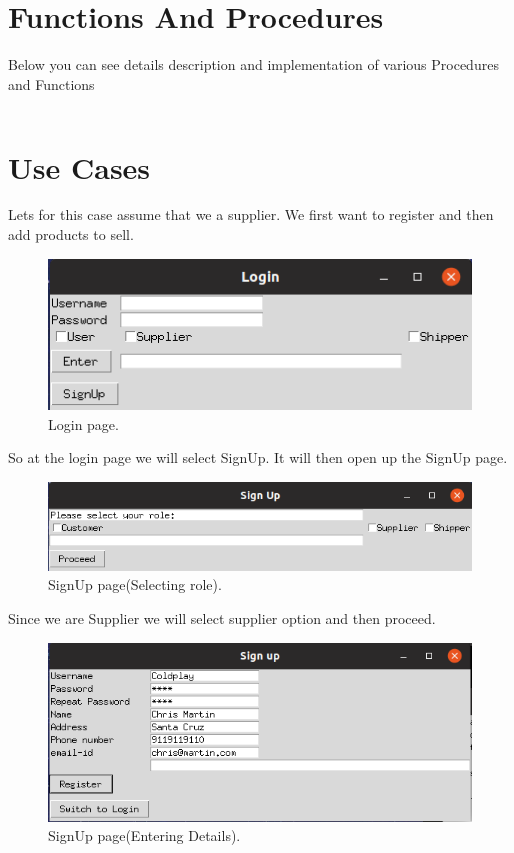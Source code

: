 \documentclass[a4paper,12pt]{article}
\begin{document}
\newpage
\section{Functions And Procedures}
Below you can see details description and implementation of various Procedures and Functions
\begin{verbatim}

\end{verbatim}
\section{Use Cases}
Lets for this case assume that we a supplier. We first want to register and then add products to sell.
\begin{figure}[H]
    \centering
    \includegraphics[scale=0.5]{login1.png} 
    \caption{Login page.}
\end{figure}
So at the login page we will select SignUp. It will then open up the SignUp page.
\begin{figure}[H]
    \centering
    \includegraphics[scale=0.5]{signup1.png}
    \caption{SignUp page(Selecting role).}
\end{figure}
Since we are Supplier we will select supplier option and then proceed.
\begin{figure}[H]
    \centering
    \includegraphics[scale=0.5]{signup2.png}
    \caption{SignUp page(Entering Details).}
\end{figure}
\end{document}

